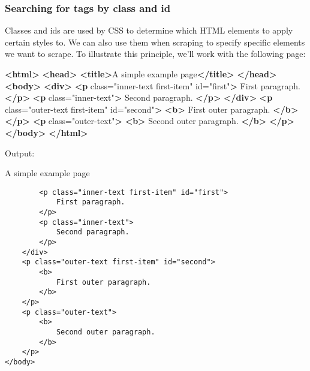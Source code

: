\documentclass[11pt]{article}
\newenvironment{Shaded}{}{}
\newcommand{\KeywordTok}[1]{\textcolor[rgb]{0.00,0.44,0.13}{\textbf{{#1}}}}
\newcommand{\StringTok}[1]{\textcolor[rgb]{0.25,0.44,0.63}{{#1}}}
\newcommand{\OtherTok}[1]{\textcolor[rgb]{0.00,0.44,0.13}{{#1}}}
\newcommand{\NormalTok}[1]{{#1}}
\begin{document}
    \hypertarget{searching-for-tags-by-class-and-id}{%
\subsubsection{Searching for tags by class and
id}\label{searching-for-tags-by-class-and-id}}

Classes and ids are used by CSS to determine which HTML elements to
apply certain styles to. We can also use them when scraping to specify
specific elements we want to scrape. To illustrate this principle, we'll
work with the following page:

\begin{Shaded}
\begin{Highlighting}[]
\KeywordTok{<html>}
    \KeywordTok{<head>}
        \KeywordTok{<title>}\NormalTok{A simple example page}\KeywordTok{</title>}
    \KeywordTok{</head>}
    \KeywordTok{<body>}
        \KeywordTok{<div>}
            \KeywordTok{<p}\OtherTok{ class=}\StringTok{"inner-text first-item"}\OtherTok{ id=}\StringTok{"first"}\KeywordTok{>}
\NormalTok{                First paragraph.}
            \KeywordTok{</p>}
            \KeywordTok{<p}\OtherTok{ class=}\StringTok{"inner-text"}\KeywordTok{>}
\NormalTok{                Second paragraph.}
            \KeywordTok{</p>}
        \KeywordTok{</div>}
        \KeywordTok{<p}\OtherTok{ class=}\StringTok{"outer-text first-item"}\OtherTok{ id=}\StringTok{"second"}\KeywordTok{>}
            \KeywordTok{<b>}
\NormalTok{                First outer paragraph.}
            \KeywordTok{</b>}
        \KeywordTok{</p>}
        \KeywordTok{<p}\OtherTok{ class=}\StringTok{"outer-text"}\KeywordTok{>}
            \KeywordTok{<b>}
\NormalTok{                Second outer paragraph.}
            \KeywordTok{</b>}
        \KeywordTok{</p>}
    \KeywordTok{</body>}
\KeywordTok{</html>}
\end{Highlighting}
\end{Shaded}

Output:

A simple example page

\begin{verbatim}
        <p class="inner-text first-item" id="first">
            First paragraph.
        </p>
        <p class="inner-text">
            Second paragraph.
        </p>
    </div>
    <p class="outer-text first-item" id="second">
        <b>
            First outer paragraph.
        </b>
    </p>
    <p class="outer-text">
        <b>
            Second outer paragraph.
        </b>
    </p>
</body>
\end{verbatim}
\end{document}
